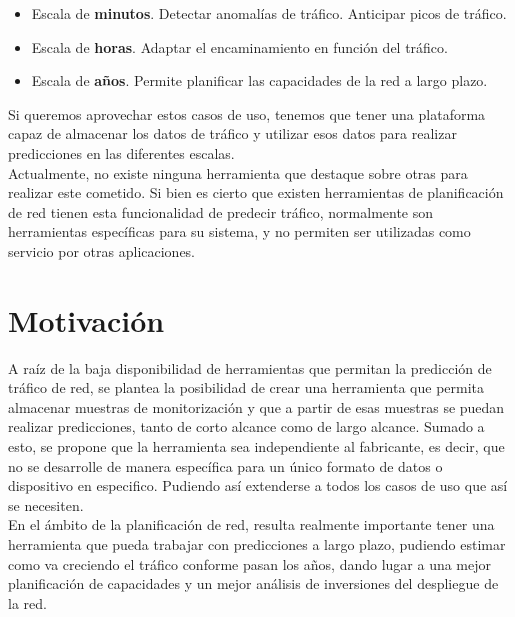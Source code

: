 \documentclass[a4paper, oneside, 12pt]{book}
\begin{document}
	\begin{itemize}
		\item Escala de \textbf{minutos}. Detectar anomalías de tráfico. Anticipar picos de tráfico.
		
		\item Escala de \textbf{horas}. Adaptar el encaminamiento en función del tráfico.
		
		\item Escala de \textbf{años}. Permite planificar las capacidades de la red a largo plazo.
	\end{itemize}
	
	\noindent Si queremos aprovechar estos casos de uso, tenemos que tener una plataforma capaz de almacenar los datos de tráfico y utilizar esos datos para realizar predicciones en las diferentes escalas. \\
	
	\noindent Actualmente, no existe ninguna herramienta que destaque sobre otras para realizar este cometido. Si bien es cierto que existen herramientas de planificación de red tienen esta funcionalidad de predecir tráfico, normalmente son herramientas específicas para su sistema, y no permiten ser utilizadas como servicio por otras aplicaciones.
	
	\section{Motivación}
	
	\noindent A raíz de la baja disponibilidad de herramientas que permitan la predicción de tráfico de red, se plantea la posibilidad de crear una herramienta que permita almacenar muestras de monitorización y que a partir de esas muestras se puedan realizar predicciones, tanto de corto alcance como de largo alcance. Sumado a esto, se propone que la herramienta sea independiente al fabricante, es decir, que no se desarrolle de manera específica para un único formato de datos o dispositivo en especifico. Pudiendo así extenderse a todos los casos de uso que así se necesiten. \\
	
	\noindent En el ámbito de la planificación de red, resulta realmente importante tener una herramienta que pueda trabajar con predicciones a largo plazo, pudiendo estimar como va creciendo el tráfico conforme pasan los años, dando lugar a una mejor planificación de capacidades y un mejor análisis de inversiones del despliegue de la red. \\
	
\end{document}
